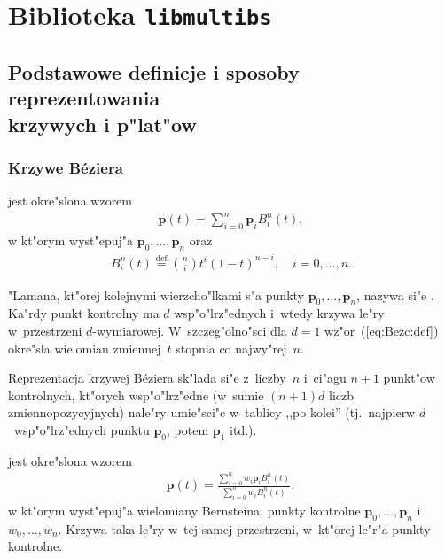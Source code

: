 

\chapter{Biblioteka \texttt{libmultibs}}

\section[Podstawowe definicje i sposoby reprezentowania krzywych i p"lat"ow]%
{Podstawowe definicje i sposoby reprezentowania \\ krzywych i p"lat"ow}

\subsection{Krzywe B\'{e}ziera}
 jest okre"slona wzorem
\begin{align}\label{eq:Bezc:def}
  \bm{p}(t) = \sum_{i=0}^n \bm{p}_iB^n_i(t),
\end{align}
w kt"orym wyst"epuj"a  $\bm{p}_0,\ldots,\bm{p}_n$
oraz 
\begin{align}
  B^n_i(t) \stackrel{\mathrm{def}}{=} \binom{n}{i}t^i(1-t)^{n-i},\quad
  i=0,\ldots,n.
\end{align}

"Lamana, kt"orej kolejnymi wierzcho"lkami s"a
punkty $\bm{p}_0,\ldots,\bm{p}_n$, nazywa si"e
 .
Ka"rdy punkt kontrolny ma $d$ wsp"o"lrz"ednych i~wtedy krzywa le"ry
w~przestrzeni $d$-wymiarowej. W~szczeg"olno"sci dla $d=1$
wz"or~(\ref{eq:Bezc:def}) okre"sla wielomian zmiennej~$t$
stopnia co najwy"rej~$n$.

Reprezentacja krzywej B\'{e}ziera sk"lada si"e z~liczby~$n$ i~ci"agu $n+1$
punkt"ow kontrolnych, kt"orych wsp"o"lrz"edne (w~sumie $(n+1)d$ liczb
zmiennopozycyjnych) nale"ry umie"sci"c w~tablicy ,,po kolei''
(tj.\ najpierw $d$~wsp"o"lrz"ednych punktu $\bm{p}_0$, potem $\bm{p}_1$
itd.).

\vspace{\medskipamount}
 jest okre"slona wzorem
\begin{align}
  \bm{p}(t) =
  \frac{\sum_{i=0}^n w_i\bm{p}_i B^n_i(t)}{\sum_{i=0}^n w_iB^n_i(t)},
\end{align}
w kt"orym wyst"epuj"a wielomiany Bernsteina, punkty kontrolne
$\bm{p}_0,\ldots,\bm{p}_n$ i~ $w_0,\ldots,w_n$. Krzywa taka
le"ry w~tej samej przestrzeni, w~kt"orej le"r"a punkty kontrolne.


